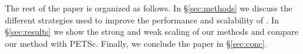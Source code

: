 The rest of the paper is organized as follows. In \S\ref{sec:methods} we discuss the different strategies used to improve the performance and scalability of \mm. In \S\ref{sec:results} we show the strong and weak scaling of our methods and compare our method with PETSc. Finally, we conclude the paper in \S\ref{sec:conc}.

